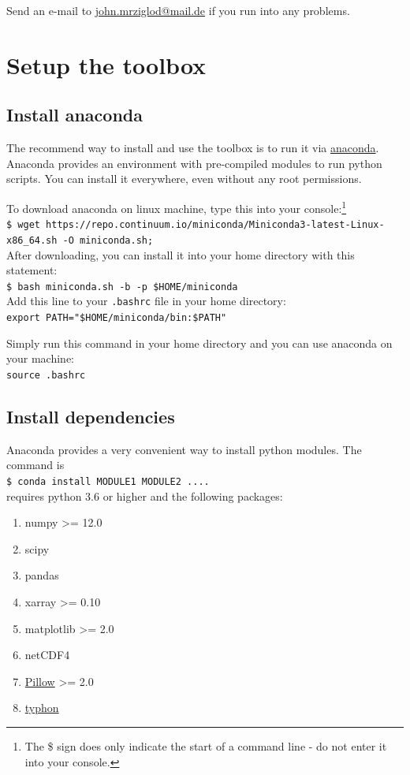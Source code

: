 \documentclass[11pt,a4paper]{article}
\begin{document}
Send an e-mail to \href{mailto:john.mrziglod@mail.de}{john.mrziglod@mail.de} if you run into any problems.

\section{Setup the \cloud toolbox}
\label{sec:setup}
\subsection{Install anaconda}
The recommend way to install and use the toolbox is to run it via \href{https://www.anaconda.com}{anaconda}. Anaconda provides an environment with pre-compiled modules to run python scripts. You can install it everywhere, even without any root permissions. 

To download anaconda on linux machine, type this into your console:\footnote{The \$ sign does only indicate the start of a command line - do not enter it into your console.}\\
\texttt{\$ wget https://repo.continuum.io/miniconda/Miniconda3-latest-Linux-x86\_64.sh -O miniconda.sh;}\\

After downloading, you can install it into your home directory with this statement:\\
\texttt{\$ bash miniconda.sh -b -p \$HOME/miniconda}\\

Add this line to your \texttt{.bashrc} file in your home directory:\\
\texttt{export PATH="\$HOME/miniconda/bin:\$PATH"}

Simply run this command in your home directory and you can use anaconda on your machine:\\
\texttt{source .bashrc}

\subsection{Install dependencies}

Anaconda provides a very convenient way to install python modules. The command is\\
\texttt{\$ conda install MODULE1 MODULE2 ....}\\

\cloud requires python 3.6 or higher and the following packages:
\begin{enumerate}
	\item numpy \textgreater= 12.0
	\item scipy
	\item pandas
	\item xarray \textgreater= 0.10
	\item matplotlib \textgreater= 2.0
	\item netCDF4
	\item \href{http://pillow.readthedocs.io/en/4.3.x/}{Pillow} \textgreater= 2.0
	\item\href{https://github.com/atmtools/typhon}{typhon}
\end{enumerate}
\end{document}
